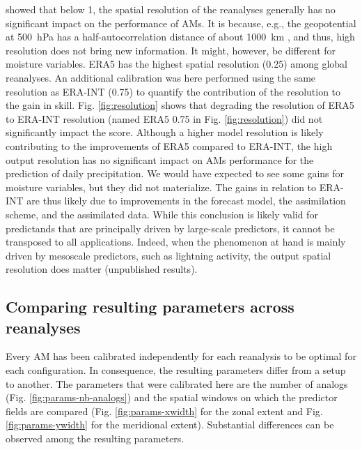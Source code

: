 \documentclass[alpha-refs]{wiley-article}
\begin{document}
\citet{Horton2018b} showed that below 1\degree, the spatial resolution of the reanalyses generally has no significant impact on the performance of AMs. It is because, e.g., the geopotential at 500~hPa has a half-autocorrelation distance of about 1000~km \citep{Thiebaux1985}, and thus, high resolution does not bring new information. It might, however, be different for moisture variables. ERA5 has the highest spatial resolution (0.25\degree) among global reanalyses. An additional calibration was here performed using the same resolution as ERA-INT (0.75\degree) to quantify the contribution of the resolution to the gain in skill. Fig. \ref{fig:resolution} shows that degrading the resolution of ERA5 to ERA-INT resolution (named ERA5 0.75 in Fig. \ref{fig:resolution}) did not significantly impact the score. Although a higher model resolution is likely contributing to the improvements of ERA5 compared to ERA-INT, the high output resolution has no significant impact on AMs performance for the prediction of daily precipitation. We would have expected to see some gains for moisture variables, but they did not materialize. The gains in relation to ERA-INT are thus likely due to improvements in the forecast model, the assimilation scheme, and the assimilated data. While this conclusion is likely valid for predictands that are principally driven by large-scale predictors, it cannot be transposed to all applications. Indeed, when the phenomenon at hand is mainly driven by mesoscale predictors, such as lightning activity, the output spatial resolution does matter (unpublished results).


\subsection{Comparing resulting parameters across reanalyses}
\label{sec:results_parameters}

Every AM has been calibrated independently for each reanalysis to be optimal for each configuration. In consequence, the resulting parameters differ from a setup to another. The parameters that were calibrated here are the number of analogs (Fig. \ref{fig:params-nb-analogs}) and the spatial windows on which the predictor fields are compared (Fig. \ref{fig:params-xwidth} for the zonal extent and Fig. \ref{fig:params-ywidth} for the meridional extent). Substantial differences can be observed among the resulting parameters.
\end{document}

